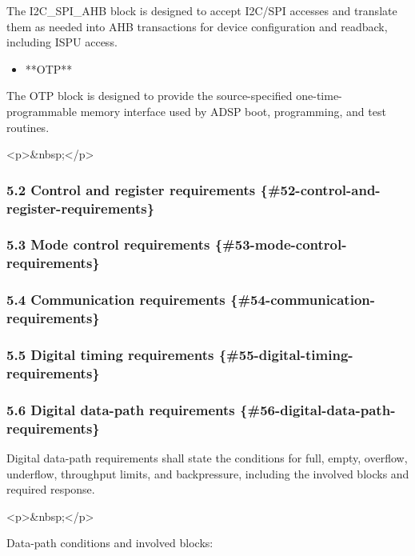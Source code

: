 \documentclass[11pt]{article}
\begin{document}
  The I2C\_SPI\_AHB block is designed to accept I2C/SPI accesses and translate them as needed into AHB transactions for device configuration and readback, including ISPU access.

\begin{itemize}
\item **OTP**
\end{itemize}

  The OTP block is designed to provide the source-specified one-time-programmable memory interface used by ADSP boot, programming, and test routines.

<p>\&nbsp;</p>

\subsubsection{5.2 Control and register requirements \{\#52-control-and-register-requirements\}}


\subsubsection{5.3 Mode control requirements \{\#53-mode-control-requirements\}}


\subsubsection{5.4 Communication requirements \{\#54-communication-requirements\}}


\subsubsection{5.5 Digital timing requirements \{\#55-digital-timing-requirements\}}


\subsubsection{5.6 Digital data-path requirements \{\#56-digital-data-path-requirements\}}


Digital data-path requirements shall state the conditions for full, empty, overflow, underflow, throughput limits, and backpressure, including the involved blocks and required response.

<p>\&nbsp;</p>

Data-path conditions and involved blocks:
\end{document}

